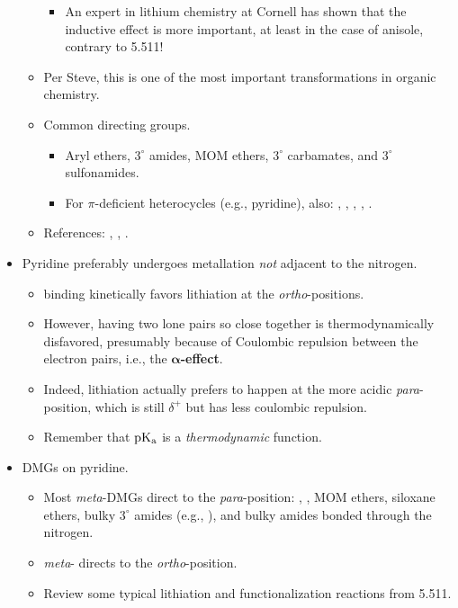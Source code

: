 \documentclass[../notes.tex]{subfiles}
\begin{document}
\begin{itemize}
\begin{itemize}
\begin{itemize}
            \item An expert in lithium chemistry at Cornell has shown that the inductive effect is more important, at least in the case of anisole, contrary to 5.511!
        \end{itemize}
        \item Per Steve, this is one of the most important transformations in organic chemistry.
        \item Common directing groups.
        \begin{itemize}
            \item Aryl ethers, $3^\circ$ amides, MOM ethers, $3^\circ$ carbamates, and $3^\circ$ sulfonamides.
            \item For $\pi$-deficient heterocycles (e.g., pyridine), also: , , , , .
        \end{itemize}
        \item References: \textcite{bib:DMGRev1}, \textcite{bib:DMGRev2}, \textcite{bib:DMGRev3}.
    \end{itemize}
    \pagebreak
    \item Pyridine preferably undergoes metallation \emph{not} adjacent to the nitrogen.
    \begin{itemize}
        \item {} binding kinetically favors lithiation at the \emph{ortho}-positions.
        \item However, having two lone pairs so close together is thermodynamically disfavored, presumably because of Coulombic repulsion between the electron pairs, i.e., the \textbf{$\bm{\alpha}$-effect}.
        \item Indeed, lithiation actually prefers to happen at the more acidic \emph{para}-position, which is still $\delta^+$ but has less coulombic repulsion.
        \item Remember that $\operatorname{\text{p}K_\text{a}}$ is a \emph{thermodynamic} function.
    \end{itemize}
    \item DMGs on pyridine.
    \begin{itemize}
        \item Most \emph{meta}-DMGs direct to the \emph{para}-position: , , MOM ethers, siloxane ethers, bulky $3^\circ$ amides (e.g., ), and bulky amides bonded through the nitrogen.
        \item \emph{meta}- directs to the \emph{ortho}-position.
        \item Review some typical lithiation and functionalization reactions from 5.511.

\end{itemize}
\end{itemize}
\end{document}

